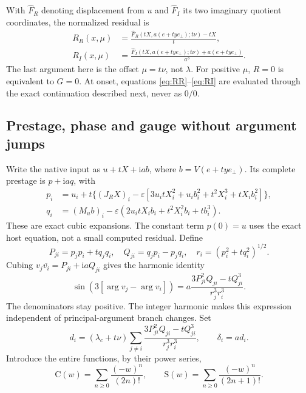 \documentclass[11pt,a4paper]{article}
\numberwithin{equation}{section}
\newcommand{\Fh}{\widehat F}\newcommand{\eps}{\varepsilon}
\newcommand{\iu}{\mathrm i}\newcommand{\one}{\mathbf 1}
\newcommand{\entC}{\mathrm C}\newcommand{\entS}{\mathrm S}
\begin{document}
With $\Fh_R$ denoting displacement from $u$ and $\Fh_I$ its two imaginary quotient coordinates, the normalized residual is
\begin{align}
R_R(x,\mu)&=\frac{\Fh_R(tX,a(e+t y e_\perp);t\nu)-tX}{t},\label{eq:RR}\\
R_I(x,\mu)&=\frac{\Fh_I(tX,a(e+t y e_\perp);t\nu)
                         +a(e+t y e_\perp)}{a^3}.\label{eq:RI}
\end{align}
The last argument here is the offset $\mu=t\nu$, not $\lambda$. For positive $\mu$, $R=0$ is equivalent to $G=0$. At onset, equations \eqref{eq:RR}--\eqref{eq:RI} are evaluated through the exact continuation described next, never as $0/0$.

\subsection{Prestage, phase and gauge without argument jumps}\label{sec:regular-formulas}
Write the native input as $u+tX+\iu a b$, where $b=V(e+t y e_\perp)$. Its complete prestage is $p+\iu a q$, with
\begin{align}
p_i&=u_i+t\bigl\{(J_RX)_i-\eps[3u_itX_i^2+u_ib_i^2
                                 +t^2X_i^3+tX_ib_i^2]\bigr\},\label{eq:p-expansion}\\
q_i&=(M_ub)_i-\eps(2u_itX_ib_i+t^2X_i^2b_i+tb_i^3).\label{eq:q-expansion}
\end{align}
These are exact cubic expansions. The constant term $p(0)=u$ uses the exact host equation, not a small computed residual. Define
\begin{equation}
P_{ji}=p_jp_i+tq_jq_i,\quad Q_{ji}=q_jp_i-p_jq_i,
\quad r_i=(p_i^2+tq_i^2)^{1/2}.\label{eq:pair-data}
\end{equation}
Cubing $v_j\overline{v_i}=P_{ji}+\iu aQ_{ji}$ gives the harmonic identity
\begin{equation}
\sin(3[\arg v_j-\arg v_i])
=a\frac{3P_{ji}^2Q_{ji}-tQ_{ji}^3}{r_j^3r_i^3}.\label{eq:harmonic}
\end{equation}
The denominators stay positive. The integer harmonic makes this expression independent of principal-argument branch changes. Set
\begin{equation}
d_i=(\lambda_c+t\nu)\sum_{j\ne i}
\frac{3P_{ji}^2Q_{ji}-tQ_{ji}^3}{r_j^3r_i^3},\qquad \delta_i=a d_i.\label{eq:d-kick}
\end{equation}
Introduce the entire functions, by their power series,
\begin{equation}
\entC(w)=\sum_{n\ge0}\frac{(-w)^n}{(2n)!},\qquad
\entS(w)=\sum_{n\ge0}\frac{(-w)^n}{(2n+1)!}.\label{eq:entire}
\end{equation}
\end{document}
